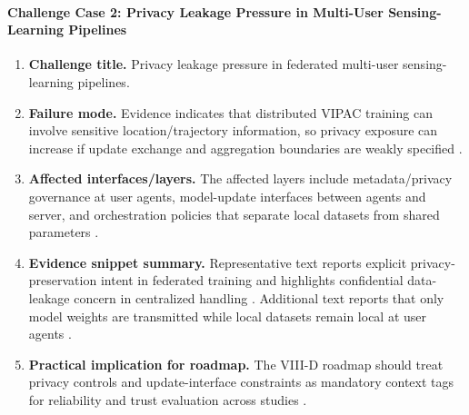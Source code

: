 \paragraph{Challenge Case 2: Privacy Leakage Pressure in Multi-User Sensing-Learning Pipelines}
\begin{enumerate}
    \item \textbf{Challenge title.} Privacy leakage pressure in federated multi-user sensing-learning pipelines.
    \item \textbf{Failure mode.} Evidence indicates that distributed VIPAC training can involve sensitive location/trajectory information, so privacy exposure can increase if update exchange and aggregation boundaries are weakly specified \cite{O_ISAC_039}.
    \item \textbf{Affected interfaces/layers.} The affected layers include metadata/privacy governance at user agents, model-update interfaces between agents and server, and orchestration policies that separate local datasets from shared parameters \cite{O_ISAC_039}.
    \item \textbf{Evidence snippet summary.} Representative text reports explicit privacy-preservation intent in federated training and highlights confidential data-leakage concern in centralized handling \cite{O_ISAC_039}. Additional text reports that only model weights are transmitted while local datasets remain local at user agents \cite{O_ISAC_039}.
    \item \textbf{Practical implication for roadmap.} The VIII-D roadmap should treat privacy controls and update-interface constraints as mandatory context tags for reliability and trust evaluation across studies \cite{O_ISAC_039}.
\end{enumerate}

